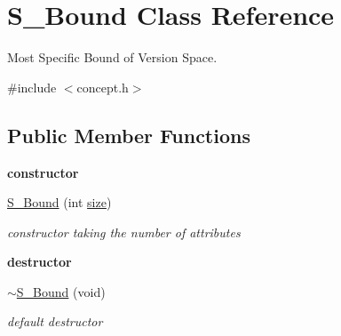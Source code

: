 \hypertarget{class_s___bound}{\section{S\-\_\-\-Bound Class Reference}
\label{class_s___bound}
}


Most Specific Bound of Version Space.  




{\ttfamily \#include $<$concept.\-h$>$}

\subsection*{Public Member Functions}
\begin{Indent}{\bf constructor}\par
\begin{DoxyCompactItemize}
\item 
\hyperlink{class_s___bound_a31e94d0262190f49639e270d34d801b8}{S\-\_\-\-Bound} (int \hyperlink{class_s___bound_a9742961078971270b164bb793b64ee06}{size})
\begin{DoxyCompactList}\small\item\em constructor taking the number of attributes \end{DoxyCompactList}\end{DoxyCompactItemize}
\end{Indent}
\begin{Indent}{\bf destructor}\par
\begin{DoxyCompactItemize}
\item 
\hyperlink{class_s___bound_a0131cccf6f5d183ee0bbc15af57f2684}{$\sim$\-S\-\_\-\-Bound} (void)
\begin{DoxyCompactList}\small\item\em default destructor \end{DoxyCompactList}\end{DoxyCompactItemize}
\end{Indent}
